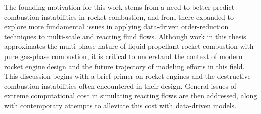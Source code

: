 The founding motivation for this work stems from a need to better predict combustion instabilities in rocket combustion, and from there expanded to explore more fundamental issues in applying data-driven order-reduction techniques to multi-scale and reacting fluid flows. Although work in this thesis approximates the multi-phase nature of liquid-propellant rocket combustion with pure gas-phase combustion, it is critical to understand the context of modern rocket engine design and the future trajectory of modeling efforts in this field. This discussion begins with a brief primer on rocket engines and the destructive combustion instabilities often encountered in their design. General issues of extreme computational cost in simulating reacting flows are then addressed, along with contemporary attempts to alleviate this cost with data-driven models.
